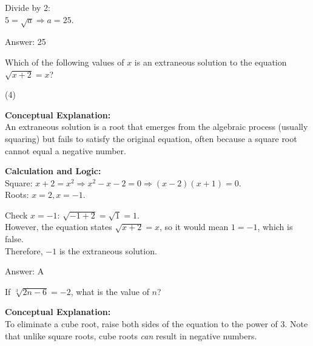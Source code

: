 \documentclass[11pt,paper=a4,answers]{exam}
\begin{document}
\begin{questions}
\begin{solution}
\vspace{10pt}

Divide by 2: \\
$5 = \sqrt{a} \Rightarrow a = 25$.

\vspace{25pt}

Answer: \colorbox{yellow!100}{25}
\end{solution}

\vspace{40pt}

\question
Which of the following values of $x$ is an extraneous solution to the equation $\sqrt{x+2} = x$?
\begin{tasks}(4)
\end{tasks}

\begin{solution}
\textbf{Conceptual Explanation:} \\
An extraneous solution is a root that emerges from the algebraic process (usually squaring) but fails to satisfy the original equation, often because a square root cannot equal a negative number.

\vspace{20pt}

\textbf{Calculation and Logic:} \\
Square: $x + 2 = x^2 \Rightarrow x^2 - x - 2 = 0 \Rightarrow (x-2)(x+1) = 0$. \\
Roots: $x = 2, x = -1$.

\vspace{10pt}

Check $x = -1$: $\sqrt{-1 + 2} = \sqrt{1} = 1$. \\
However, the equation states $\sqrt{x+2} = x$, so it would mean $1 = -1$, which is false. \\
Therefore, $-1$ is the extraneous solution.

\vspace{25pt}

Answer: \colorbox{yellow!100}{A}
\end{solution}

\vspace{40pt}

\question
If $\sqrt[3]{2n - 6} = -2$, what is the value of $n$?

\begin{solution}
\textbf{Conceptual Explanation:} \\
To eliminate a cube root, raise both sides of the equation to the power of 3. Note that unlike square roots, cube roots \textit{can} result in negative numbers.


\end{solution}
\end{questions}
\end{document}

